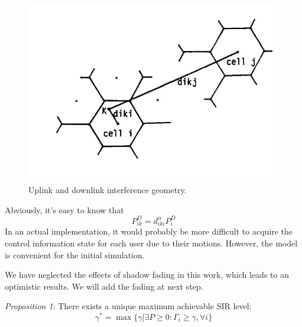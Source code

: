 \documentclass[conference]{IEEEtran}
\begin{document}
\begin{figure}[th]
	\centering
	\includegraphics[scale=0.3]{t}
	\caption{Uplink and downlink interference geometry.}
	\label{fig:t}
\end{figure}

Abviously, it's easy to know that
\begin{equation}
P^{D}_{ik} = d^\alpha_{iki}P_i^D
\end{equation}
In an actual implementation, it would probably be more difficult to acquire the control information state for each user due to their motions. However, the model is convenient for the initial simulation.

We have neglected the effects of shadow fading in this work, which leads to an optimistic results. We will add the fading at next step.

\textit{Proposition 1}: There exists a unique maximum achievable SIR level:
\begin{equation}
 \gamma^{*} = \max\{\gamma | \exists P\geq 0 : \Gamma_i \geq \gamma, \forall i \}
\end{equation}

\end{document}

